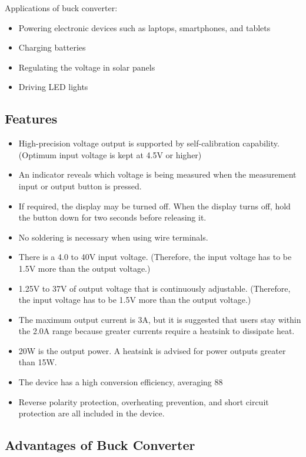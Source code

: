 \documentclass[
12pt,
oneside, 
onehalfspacing, 
nolistspacing, 
parskip, 
chapterinoneline, 
]{AASTCOMPUTER}
\begin{document}
Applications of buck converter:
\begin{itemize}
    \item Powering electronic devices such as laptops, smartphones, and tablets
    \item Charging batteries
    \item Regulating the voltage in solar panels
    \item Driving LED lights
\end{itemize}

\subsection{Features}

\begin{itemize}
    \item High-precision voltage output is supported by self-calibration capability. (Optimum input voltage is kept at 4.5V or higher)
    \item An indicator reveals which voltage is being measured when the measurement input or output button is pressed.
    \item If required, the display may be turned off. When the display turns off, hold the button down for two seconds before releasing it.
    \item No soldering is necessary when using wire terminals.
    \item There is a 4.0 to 40V input voltage. (Therefore, the input voltage has to be 1.5V more than the output voltage.)
    \item 1.25V to 37V of output voltage that is continuously adjustable. (Therefore, the input voltage has to be 1.5V more than the output voltage.)
    \item The maximum output current is 3A, but it is suggested that users stay within the 2.0A range because greater currents require a heatsink to dissipate heat.
    \item 20W is the output power. A heatsink is advised for power outputs greater than 15W.
    \item The device has a high conversion efficiency, averaging 88%
    \item Reverse polarity protection, overheating prevention, and short circuit protection are all included in the device.
\end{itemize}

\subsection{Advantages of Buck Converter}
\end{document}
